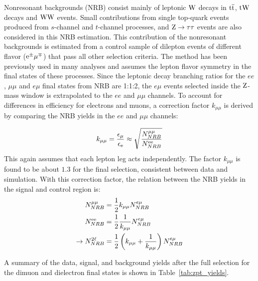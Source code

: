 Nonresonant backgrounds (NRB) consist mainly 
 of leptonic $\mathrm{W}$ decays in ${\mathrm{t}\overline{\mathrm{t}}}$, $\mathrm{t}\mathrm{W}$ decays and $\mathrm{W}\mathrm{W}$ events. 
 Small contributions from single top-quark events produced from
$s$-channel and $t$-channel processes, and $\mathrm{Z}\rightarrow \mathrm{\tau}\mathrm{\tau}$
events are also considered in this NRB estimation. 
This contribution of the nonresonant backgrounds is estimated from a control
sample of dilepton events of different flavor ($\mathrm{e}^{\pm}\mathrm{\mu}^{\mp}$) 
that pass all other selection criteria.
The method has been previously used in many analyses and assumes the lepton flavor symmetry in the final states of these processes.
Since the leptonic decay branching ratios for the $ee$, $\mu\mu$ and $e\mu$ final states from NRB are 1:1:2,
the $e\mu$ events selected inside the $\mathrm{Z}$-mass window is extrapolated to the $ee$ and $\mu\mu$ channels.
To account for differences in efficiency for electrons and muons, 
a correction factor $k_{\mu\mu}$ is derived by comparing the NRB yields in the $ee$ and $\mu\mu$ channels:

\begin{equation}
\label{eq:kee}
k_{\mu\mu} = \frac{\epsilon_\mu}{\epsilon_{\mathrm{e}}} \approx \sqrt{\frac{N^{\mu\mu}_{NRB}}{N^{\mathrm{e}\mathrm{e}}_{NRB}}}
\end{equation}
This again assumes that each lepton leg acts independently.
The factor $k_{\mu\mu}$ is found to be about $1.3$ for the final selection, 
consistent between data and simulation. 
With this correction factor, the relation between the NRB yields in the signal and control region is:
\begin{equation}
\label{eq:nrb_xfer}
\begin{split}
  N^{\mu\mu}_{NRB}     &= \frac{1}{2} k_{\mu\mu} N^{e\mu}_{NRB} \\
  N^{\mathrm{e}\mathrm{e}}_{NRB} &= \frac{1}{2} \frac{1}{k_{\mu\mu}} N^{e\mu}_{NRB} \\
\rightarrow N^{2\ell}_{NRB}  &= \frac{1}{2} \left( k_{\mu\mu} + \frac{1}{k_{\mu\mu}} \right) N^{e\mu}_{NRB}
\end{split}
\end{equation}

A summary of the data, signal, and background yields after the full selection for the dimuon and dielectron 
final states is shown in Table~\ref{tab:zpt_yields}.

